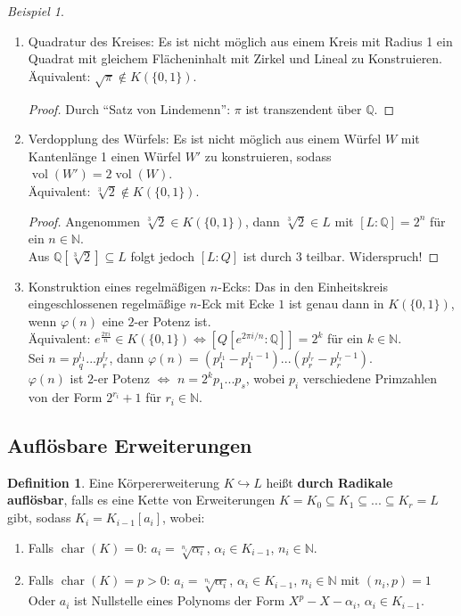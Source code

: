 \documentclass[10pt,a4paper]{article}
\newcommand{\N}{\ensuremath{\mathbb{N}}}
\newcommand{\Q}{\ensuremath{\mathbb{Q}}}
\newcommand{\al}{\ensuremath{\alpha}}
\newcommand{\cha}{\ensuremath{\operatorname{char}}}
\newcounter{thm}[section]
\theoremstyle{definition}
\newtheorem{definition}[thm]{Definition}
\theoremstyle{plain}
\theoremstyle{remark}
\newtheorem{exm}[thm]{Beispiel}
\begin{document}
\begin{exm}
	\begin{enumerate}
		\item Quadratur des Kreises: Es ist nicht möglich aus einem Kreis mit Radius 1 ein Quadrat mit gleichem Flächeninhalt mit Zirkel und Lineal zu Konstruieren.\\
		Äquivalent: $\sqrt{\pi}\notin K(\{0,1\})$.\\
		\begin{proof}
			Durch ``Satz von Lindemenn'': $\pi$ ist transzendent über $\Q$.
		\end{proof}
		\item Verdopplung des Würfels: Es ist nicht möglich aus einem Würfel $W$ mit Kantenlänge 1 einen Würfel $W'$ zu konstruieren, sodass $\operatorname{vol}(W')=2\operatorname{vol}(W)$.\\
		Äquivalent: $\sqrt[3]{2}\notin K(\{0,1\})$.
		\begin{proof}
			Angenommen $\sqrt[3]{2}\in K(\{0,1\})$, dann $\sqrt[3]{2}\in L$ mit $[L:\Q]=2^n$ für ein $n\in\N$.\\
			Aus $\Q[\sqrt[3]{2}]\subseteq L$ folgt jedoch $[L:Q]$ ist durch $3$ teilbar. Widerspruch!
		\end{proof}
		\item Konstruktion eines regelmäßigen $n$-Ecks: Das in den Einheitskreis eingeschlossenen regelmäßige $n$-Eck mit Ecke $1$ ist genau dann in $K(\{0,1\})$, wenn $\varphi(n)$ eine $2$-er Potenz ist.\\
		Äquivalent: $e^{\frac{2\pi i}{n}}\in K(\{0,1\})\Leftrightarrow [Q[e^{2\pi i/n}:\Q]]=2^k$ für ein $k\in\N$.\\
		Sei $n=p_q^{l_1}...p_r^{l_r}$, dann $\varphi(n)=(p_1^{l_1}-p_1^{l_1-1})...(p_r^{l_r}-p_r^{l_r-1})$.\\
		$\varphi(n)$ ist $2$-er Potenz $\Leftrightarrow $ $n=2^kp_1...p_s$, wobei $p_i$ verschiedene Primzahlen von der Form $2^{r_i}+1$ für $r_i\in\N$.
	\end{enumerate}
\end{exm}





\subsection{Auflösbare Erweiterungen}
\begin{definition}
	Eine Körpererweiterung $K\hookrightarrow L$ heißt \textbf{durch Radikale auflösbar}, falls es eine Kette von Erweiterungen $K=K_0\subseteq K_1\subseteq...\subseteq K_r=L$ gibt, sodass $K_i=K_{i-1}[a_i]$, wobei:
	\begin{enumerate}
		\item Falls $\cha(K)=0$: $a_i=\sqrt[n_i]{\alpha_i}$, $\alpha_i\in K_{i-1}$, $n_i\in\N$.
		\item Falls $\cha(K)=p>0$: $a_i=\sqrt[n_i]{\alpha_i}$, $\alpha_i\in K_{i-1}$, $n_i\in\N$ mit $(n_i,p)=1$\\
		Oder $a_i$ ist Nullstelle eines Polynoms der Form $X^p-X-\al_i$, $\al_i\in K_{i-1}$.
	\end{enumerate}
\end{definition}
\end{document}
